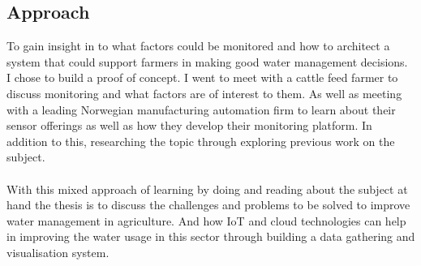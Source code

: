 \documentclass[]{uiophd}
\begin{document}
\subsection{Approach}
To gain insight in to what factors could be monitored and how to architect a system that could support farmers in making good water management decisions. I chose to build a proof of concept. I went to meet with a cattle feed farmer to discuss monitoring and what factors are of interest to them. As well as meeting with a leading Norwegian manufacturing automation firm to learn about their sensor offerings as well as how they develop their monitoring platform. In addition to this, researching the topic through exploring previous work on the subject.
\\\\
With this mixed approach of learning by doing and reading about the subject at hand the thesis is to discuss the challenges and problems to be solved to improve water management in agriculture. And how IoT and cloud technologies can help in improving the water usage in this sector through building a data gathering and visualisation system.
\\\\
\end{document}
